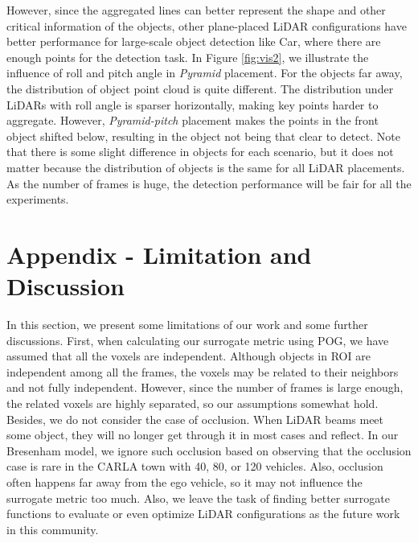 \documentclass[10pt,twocolumn,letterpaper]{article}
\begin{document}
 However, since the aggregated lines can better represent the shape and other critical information of the objects,  other plane-placed LiDAR configurations have better performance for large-scale object detection like Car, where there are enough points for the detection task.
In Figure \ref{fig:vis2}, we illustrate the influence of roll and pitch angle in \textit{Pyramid} placement. For the objects far away, the distribution of object point cloud is quite different. The distribution under LiDARs with roll angle is sparser horizontally, making key points harder to aggregate. However, \textit{Pyramid-pitch} placement makes the points in the front object shifted below, resulting in the object not being that clear to detect. Note that there is some slight difference in objects for each scenario, but it does not matter because the distribution of objects is the same for all LiDAR placements. As the number of frames is huge, the detection performance will be fair for all the experiments.



\section{Appendix - Limitation and Discussion}
In this section, we present some limitations of our work and some further discussions. First, when calculating our surrogate metric using POG, we have assumed that all the voxels are independent. Although objects in ROI are independent among all the frames, the voxels may be related to their neighbors and not fully independent. However, since the number of frames is large enough, the related voxels are highly separated, so our assumptions somewhat hold. Besides, we do not consider the case of occlusion. When LiDAR beams meet some object, they will no longer get through it in most cases and reflect. In our Bresenham model, we ignore such occlusion based on observing that the occlusion case is rare in the CARLA town with 40, 80, or 120 vehicles. Also, occlusion often happens far away from the ego vehicle, so it may not influence the surrogate metric too much. Also, we leave the task of finding better surrogate functions to evaluate or even optimize LiDAR configurations as the future work in this community.
\end{document}
